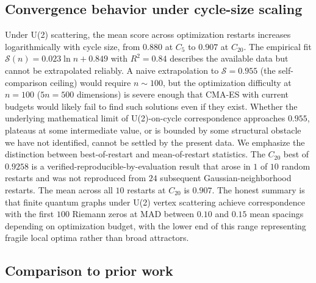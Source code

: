 \documentclass[cntp]{ipart}
\theoremstyle{plain}
\theoremstyle{remark}
\begin{document}
\subsection{Convergence behavior under cycle-size scaling}
\label{sec:disc-convergence}

Under U(2) scattering, the mean score across optimization restarts increases logarithmically with cycle size, from $0.880$ at $C_5$ to $0.907$ at $C_{20}$. The empirical fit $\mathcal{S}(n) = 0.023 \ln n + 0.849$ with $R^2 = 0.84$ describes the available data but cannot be extrapolated reliably. A naive extrapolation to $\mathcal{S} = 0.955$ (the self-comparison ceiling) would require $n \sim 100$, but the optimization difficulty at $n = 100$ ($5n = 500$ dimensions) is severe enough that CMA-ES with current budgets would likely fail to find such solutions even if they exist. Whether the underlying mathematical limit of U(2)-on-cycle correspondence approaches $0.955$, plateaus at some intermediate value, or is bounded by some structural obstacle we have not identified, cannot be settled by the present data. We emphasize the distinction between best-of-restart and mean-of-restart statistics. The $C_{20}$ best of $0.9258$ is a verified-reproducible-by-evaluation result that arose in $1$ of $10$ random restarts and was not reproduced from $24$ subsequent Gaussian-neighborhood restarts. The mean across all $10$ restarts at $C_{20}$ is $0.907$. The honest summary is that finite quantum graphs under U(2) vertex scattering achieve correspondence with the first $100$ Riemann zeros at MAD between $0.10$ and $0.15$ mean spacings depending on optimization budget, with the lower end of this range representing fragile local optima rather than broad attractors.

\subsection{Comparison to prior work}
\label{sec:disc-prior}
\end{document}
